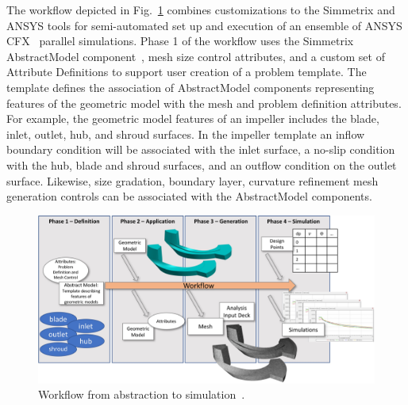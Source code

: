 The workflow depicted in Fig.~\ref{fig:pumps} combines customizations to the
Simmetrix and ANSYS tools for semi-automated set up and execution of an ensemble
of \mbox{ANSYS} CFX~\cite{ansysCFX} parallel simulations.
Phase 1 of the workflow uses the Simmetrix AbstractModel
component~\cite{simmodsuite,simmetrixAbstractModel}, mesh size control
attributes, and a custom set of Attribute Definitions to support user creation
of a problem template.
The template defines the association of AbstractModel components
representing features of the geometric model with the mesh and problem
definition attributes.
For example, the geometric model features of an impeller includes the blade,
inlet, outlet, hub, and shroud surfaces.
In the impeller template an inflow boundary condition will be associated with
the inlet surface, a no-slip condition with the hub, blade and shroud surfaces,
and an outflow condition on the outlet surface.
Likewise, size gradation, boundary layer, curvature refinement mesh generation
controls can be associated with the AbstractModel components.

\begin{figure} \centering
  \includegraphics[width=\textwidth]{figures/pumpAbstractModelWorkflowSummary.jpg}
  \caption{
    Workflow from abstraction to simulation~\cite{simmodsuite}.
  }
  \label{fig:pumps}
\end{figure}

